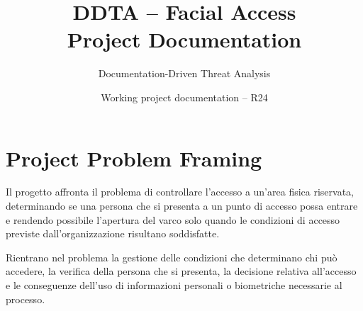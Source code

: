 \documentclass[11pt,a4paper]{article}
\title{DDTA -- Facial Access\\Project Documentation}
\author{Documentation-Driven Threat Analysis}
\date{Working project documentation -- R24}
\begin{document}
\maketitle

\section{Project Problem Framing}

Il progetto affronta il problema di controllare l'accesso a un'area fisica riservata, determinando se una persona che si presenta a un punto di accesso possa entrare e rendendo possibile l'apertura del varco solo quando le condizioni di accesso previste dall'organizzazione risultano soddisfatte.

Rientrano nel problema la gestione delle condizioni che determinano chi può accedere, la verifica della persona che si presenta, la decisione relativa all'accesso e le conseguenze dell'uso di informazioni personali o biometriche necessarie al processo.

\newpage

\end{document}
